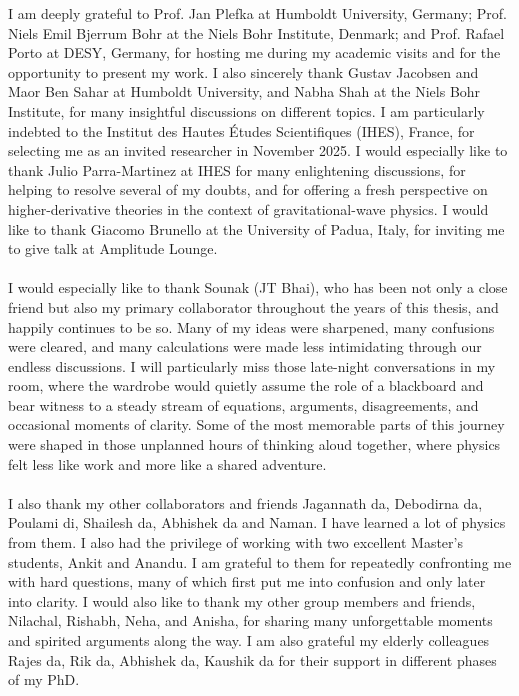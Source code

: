 \documentclass[11pt,a4paper,oneside]{book}
\begin{document}
I am deeply grateful to Prof. Jan Plefka at Humboldt University, Germany; Prof. Niels Emil Bjerrum Bohr at the Niels Bohr Institute, Denmark; and Prof. Rafael Porto at DESY, Germany, for hosting me during my academic visits and for the opportunity to present my work. I also sincerely thank Gustav Jacobsen and Maor Ben Sahar at Humboldt University, and Nabha Shah at the Niels Bohr Institute, for many insightful discussions on different topics. I am particularly indebted to the Institut des Hautes Études Scientifiques (IHES), France, for selecting me as an invited researcher in November 2025. I would especially like to thank Julio Parra-Martinez at IHES for many enlightening discussions, for helping to resolve several of my doubts, and for offering a fresh perspective on higher-derivative theories in the context of gravitational-wave physics. I would like to thank Giacomo Brunello at the University of Padua, Italy, for inviting me to give talk at Amplitude Lounge.\\\\
I would especially like to thank Sounak (JT Bhai), who has been not only a close friend but also my primary collaborator throughout the years of this thesis, and happily continues to be so. 
Many of my ideas were sharpened, many confusions were cleared, and many calculations were made less intimidating through our endless discussions. I will particularly miss those late-night conversations in my room, where the wardrobe would quietly assume the role of a blackboard and bear witness to a steady stream of equations, arguments, disagreements, and occasional moments of clarity. Some of the most memorable parts of this journey were shaped in those unplanned hours of thinking aloud together, where physics felt less like work and more like a shared adventure.\\\\
I also thank my other collaborators and friends Jagannath da, Debodirna da, Poulami di, Shailesh da, Abhishek da and  Naman. I have learned a lot of physics from them. I also had the privilege of working with two excellent Master's students, Ankit and Anandu. I am grateful to them for repeatedly confronting me with hard questions, many of which first put me into confusion and only later into clarity. I would also like to thank my other group members and friends, Nilachal, Rishabh, Neha, and Anisha, for sharing many unforgettable moments and spirited arguments along the way. I am also grateful my elderly colleagues Rajes da, Rik da, Abhishek da, Kaushik da for their support in different phases of my PhD. 
\end{document}

